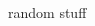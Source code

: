 \documentclass[12pt,t,aspectratio=169]{beamer}
\begin{document}
\begin{frame}[c]{random stuff}

  \begin{columns}[c]
    \begin{column}{0.25\textwidth}
      \href{https://twitter.com/oiioiioioiiioio/status/1186931015756996608}{}

    \end{column}

    \begin{column}{0.25\textwidth}
      \href{https://twitter.com/ryanlrussell/status/1186345219496636418}{}

    \end{column}

    \begin{column}{0.25\textwidth}
      \href{https://twitter.com/thomasp85/status/1184202551664754688}{}

    \end{column}

    \begin{column}{0.25\textwidth}
      \href{https://twitter.com/CamronBryantPhD/status/1183432400577220610}{}

    \end{column}

  \end{columns}

\end{frame}
\end{document}

